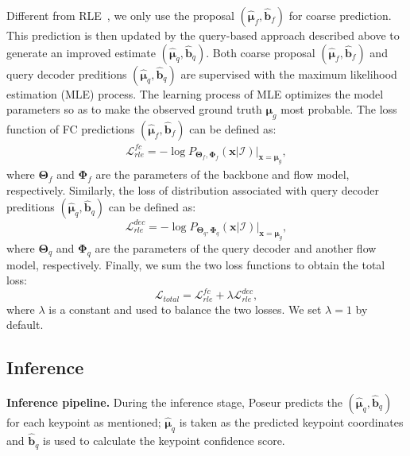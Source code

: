 \documentclass[runningheads]{llncs}
\def\handle{{Poseur}\xspace}
\def\loc{{\boldsymbol{\mu}}}
\def\b{{\boldsymbol{b}}}
\def\x{{\mathbf{x}}}
\def\BTheta{{\boldsymbol{\Theta}}}
\def\BPhi{{\boldsymbol{\Phi}}}
\begin{document}
Different from RLE~\cite{li2021rle}, we only use the proposal $(\hat{\loc}_{f}, \hat{\boldsymbol{b}}_{f})$ for coarse prediction. This prediction is then updated by the query-based approach described above to generate an improved estimate $(\hat{\loc}_{q}, \hat{\boldsymbol{b}}_{q})$. Both coarse proposal $(\hat{\loc}_{f}, \hat{\boldsymbol{b}}_{f})$ and query decoder preditions $(\hat{\loc}_{q}, \hat{\boldsymbol{b}}_{q})$ are supervised with the maximum likelihood estimation (MLE) process. The learning process of MLE optimizes the model parameters so as to make the observed ground truth $\loc_{g}$ most probable. The loss function of FC predictions $(\hat{\loc}_{f}, \hat{\boldsymbol{b}}_{f})$ can be defined as:
\begin{equation}\label{equation:fc_loss}
\begin{aligned}
    \mathcal{L}_{rle}^{fc} = - \log P_{{\BTheta}_{f},{\BPhi}_{f}}(\x | \mathcal{I}) \Big|_{\x = \loc_g},
\end{aligned}
\end{equation}
where $\BTheta_{f}$ and $\BPhi_{f}$ are the parameters of the backbone and flow model, respectively.
Similarly, the loss of distribution associated with query decoder preditions $(\hat{\loc}_{q}, \hat{\boldsymbol{b}}_{q})$ can be defined as:
\begin{equation}\label{equation:loss func}
    \mathcal{L}_{rle}^{dec} = - \log P_{{\BTheta}_{q},{\BPhi}_{q}}(\x | \mathcal{I}) \Big|_{\x = \loc_g},
\end{equation}
where $\BTheta_{q}$ and $\BPhi_{q}$ are the parameters of the query decoder and another flow model, respectively.
Finally, we sum the two loss functions to obtain the total loss:
\begin{equation}\label{equation:loss func}
    \mathcal{L}_{total} = \mathcal{L}_{rle}^{fc} + \lambda \mathcal{L}_{rle}^{dec},
\end{equation}
where $\lambda$ is a constant and used to balance the two losses. We set $\lambda = 1$ by default.







\subsection{Inference}\label{sec:score}
\noindent\textbf{Inference pipeline.} 
During the inference stage, \handle predicts the $(\hat{\loc}_{q}, \hat{\b}_{q})$ for each keypoint as mentioned; $\hat{\loc}_{q}$ is taken as the predicted keypoint coordinates and $\hat{\boldsymbol{b}}_{q}$ is used to calculate the keypoint confidence score.
\end{document}
